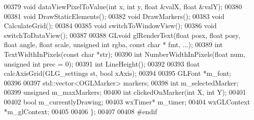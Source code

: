 \begin{DoxyCode}
00379     \textcolor{keywordtype}{void} dataViewPixelToValue(\textcolor{keywordtype}{int} x, \textcolor{keywordtype}{int} y, \textcolor{keywordtype}{float} &valX, \textcolor{keywordtype}{float} &valY);
00380 
00381     \textcolor{keywordtype}{void} DrawStaticElements();
00382     \textcolor{keywordtype}{void} DrawMarkers();
00383     \textcolor{keywordtype}{void} CalculateGrid();
00384 
00385     \textcolor{keywordtype}{void} switchToWindowView();
00386     \textcolor{keywordtype}{void} switchToDataView();
00387 
00388     GLvoid glRenderText(\textcolor{keywordtype}{float} posx, \textcolor{keywordtype}{float} posy, \textcolor{keywordtype}{float} angle, \textcolor{keywordtype}{float} scale, \textcolor{keywordtype}{unsigned} \textcolor{keywordtype}{int} rgba, const \textcolor{keywordtype}{char} *
      fmt, ...);
00389     \textcolor{keywordtype}{int} TextWidthInPixels(const \textcolor{keywordtype}{char} *str);
00390     \textcolor{keywordtype}{int} NumberWidthInPixels(\textcolor{keywordtype}{float} num, \textcolor{keywordtype}{unsigned} \textcolor{keywordtype}{int} prec = 0);
00391     \textcolor{keywordtype}{int} LineHeight();
00392 
00393     \textcolor{keywordtype}{float} calcAxisGrid(GLG_settings st, \textcolor{keywordtype}{bool} xAxis);
00394 
00395     GLFont *m\_font;
00396 
00397     std::vector<OGLMarker> markers;
00398     \textcolor{keywordtype}{int} m\_selectedMarker;
00399     \textcolor{keywordtype}{unsigned} m\_maxMarkers;
00400     \textcolor{keywordtype}{int} clickedOnMarker(\textcolor{keywordtype}{int} X, \textcolor{keywordtype}{int} Y);
00401 
00402     \textcolor{keywordtype}{bool} m\_currentlyDrawing;
00403     wxTimer* m\_timer;
00404     wxGLContext *m\_glContext;
00405 
00406 \};
00407 
00408 \textcolor{preprocessor}{#endif}
\end{DoxyCode}
